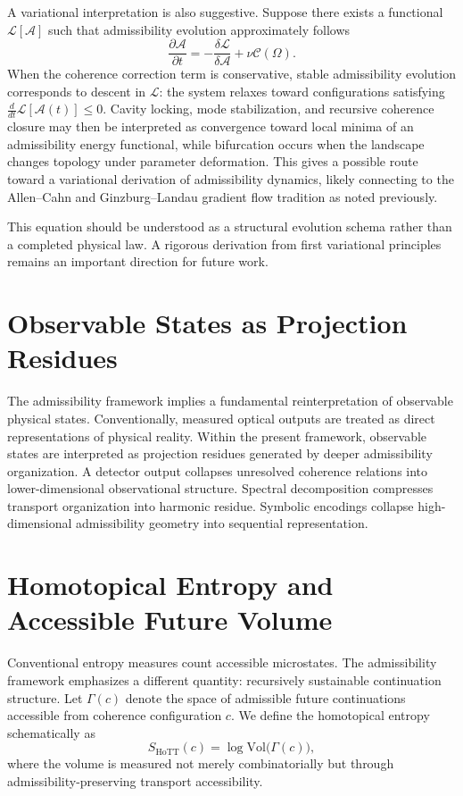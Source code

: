\documentclass[11pt,openany]{book}
\theoremstyle{definition}
\theoremstyle{plain}
\newcommand{\Afield}{\mathcal{A}}
\newcommand{\Cfield}{\mathcal{C}}
\begin{document}
A variational interpretation is also suggestive. Suppose there exists a functional $\mathcal{L}[\Afield]$ such that admissibility evolution approximately follows
\[
\frac{\partial \Afield}{\partial t}
=
-\frac{\delta \mathcal{L}}{\delta \Afield}
+
\nu\Cfield(\Omega).
\]
When the coherence correction term is conservative, stable admissibility evolution corresponds to descent in $\mathcal{L}$: the system relaxes toward configurations satisfying $\frac{d}{dt}\mathcal{L}[\Afield(t)] \leq 0$. Cavity locking, mode stabilization, and recursive coherence closure may then be interpreted as convergence toward local minima of an admissibility energy functional, while bifurcation occurs when the landscape changes topology under parameter deformation. This gives a possible route toward a variational derivation of admissibility dynamics, likely connecting to the Allen--Cahn and Ginzburg--Landau gradient flow tradition as noted previously.

This equation should be understood as a structural evolution schema rather than a completed physical law. A rigorous derivation from first variational principles remains an important direction for future work.

\section{Observable States as Projection Residues}

The admissibility framework implies a fundamental reinterpretation of observable physical states. Conventionally, measured optical outputs are treated as direct representations of physical reality. Within the present framework, observable states are interpreted as projection residues generated by deeper admissibility organization. A detector output collapses unresolved coherence relations into lower-dimensional observational structure. Spectral decomposition compresses transport organization into harmonic residue. Symbolic encodings collapse high-dimensional admissibility geometry into sequential representation.

\section{Homotopical Entropy and Accessible Future Volume}

Conventional entropy measures count accessible microstates. The admissibility framework emphasizes a different quantity: recursively sustainable continuation structure. Let $\Gamma(c)$ denote the space of admissible future continuations accessible from coherence configuration $c$. We define the homotopical entropy schematically as
\[
S_{\mathrm{HoTT}}(c) = \log \mathrm{Vol}\bigl(\Gamma(c)\bigr),
\]
where the volume is measured not merely combinatorially but through admissibility-preserving transport accessibility.
\end{document}

